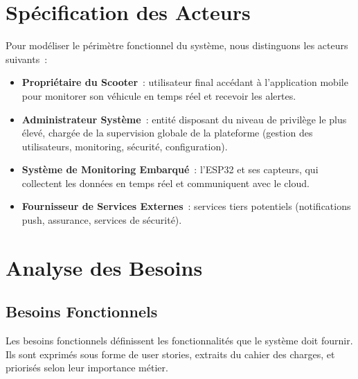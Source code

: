 \documentclass[12pt, a4paper]{report}
\begin{document}
\section{Spécification des Acteurs}

Pour modéliser le périmètre fonctionnel du système, nous distinguons les acteurs
suivants~:

\begin{itemize}
  \item \textbf{Propriétaire du Scooter}~: utilisateur final accédant à l'application
        mobile pour monitorer son véhicule en temps réel et recevoir les alertes.
  \item \textbf{Administrateur Système}~: entité disposant du niveau de privilège
        le plus élevé, chargée de la supervision globale de la plateforme (gestion
        des utilisateurs, monitoring, sécurité, configuration).
  \item \textbf{Système de Monitoring Embarqué}~: l'ESP32 et ses capteurs, qui
        collectent les données en temps réel et communiquent avec le cloud.
  \item \textbf{Fournisseur de Services Externes}~: services tiers potentiels
        (notifications push, assurance, services de sécurité).
\end{itemize}

\section{Analyse des Besoins}

\subsection{Besoins Fonctionnels}

Les besoins fonctionnels définissent les fonctionnalités que le système doit fournir.
Ils sont exprimés sous forme de user stories, extraits du cahier des charges, et
priorisés selon leur importance métier.
\end{document}
